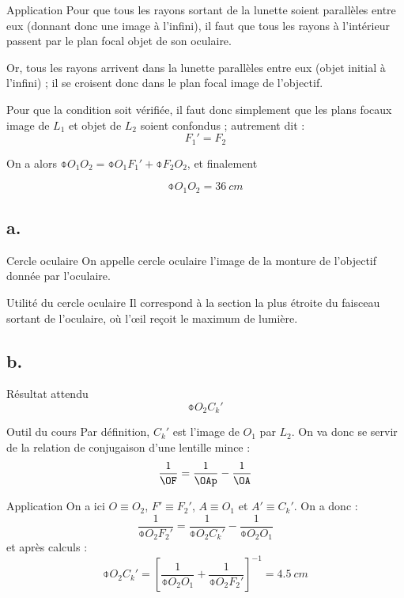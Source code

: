\documentclass[../main/main.tex]{subfiles}
\begin{document}
\begin{NCexem}{Application}
    Pour que tous les rayons sortant de la lunette soient parallèles entre eux
    (donnant donc une image à l'infini), il faut que tous les rayons à
    l'intérieur passent par le plan focal objet de son oculaire.\bigbreak

    Or, tous les rayons arrivent dans la lunette parallèles entre eux (objet
    initial à l'infini) ; il se croisent donc dans le plan focal image de
    l'objectif. \bigbreak

    Pour que la condition soit vérifiée, il faut donc simplement que les plans
    focaux image de $L_1$ et objet de $L_2$ soient confondus ; autrement dit :
    \[ \boxed{F_1' = F_2} \]
    
    On a alors $\obar{O_1O_2} = \obar{O_1F_1'} + \obar{F_2O_2}$, et finalement

    \[ \boxed{\obar{O_1O_2} = \SI{+36}{cm}} \]
\end{NCexem}

\subsection{a.}
\begin{defi}{Cercle oculaire}
    On appelle cercle oculaire l'image de la monture de l'objectif donnée par
    l'oculaire.
\end{defi}

\begin{inte}{Utilité du cercle oculaire}
    Il correspond à la section la plus étroite du faisceau sortant de
    l'oculaire, où l'œil reçoit le maximum de lumière.  
\end{inte}

\setcounter{subsection}{2}
\subsection{b.}
\begin{NCprop}{Résultat attendu}
    $$\obar{O_2C_k'}$$
\end{NCprop}

\begin{NCdemo}{Outil du cours}
    Par définition, $C_k'$ est l'image de $O_1$ par $L_2$. On va donc se servir
    de la relation de conjugaison d'une lentille mince :
    \[ \frac{1}{\OF} = \frac{1}{\OAp} - \frac{1}{\OA} \]
\end{NCdemo}

\begin{NCexem}{Application}
    On a ici $O \equiv O_2$, $F' \equiv F_2'$, $A \equiv O_1$ et $A' \equiv
    C_k'$. On a donc :
    \[ \frac{1}{\obar{O_2F_2'}} = \frac{1}{\obar{O_2C_k'}} -
    \frac{1}{\obar{O_2O_1}} \]
    et après calculs :
    \[ \boxed{\obar{O_2C_k'} = \left[ \frac{1}{\obar{O_2O_1}} +
    \frac{1}{\obar{O_2F_2'}}\right]^{-1} = \SI{+4.5}{cm}} \]
\end{NCexem}
\end{document}
